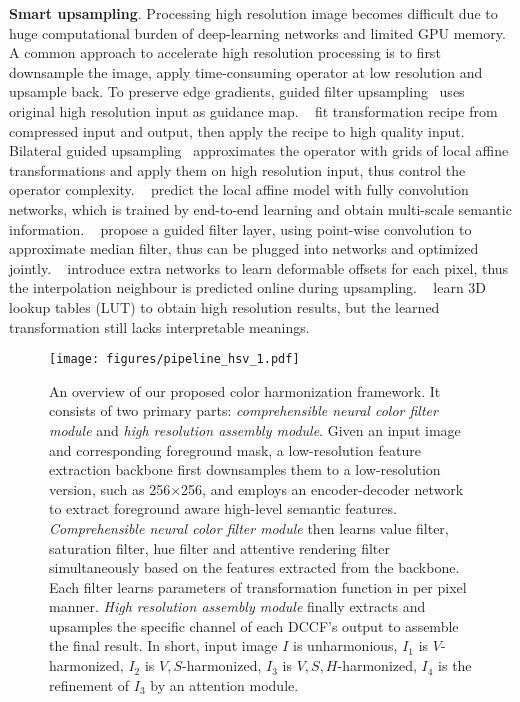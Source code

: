 \documentclass[runningheads]{llncs}
\begin{document}
    \noindent\textbf{Smart upsampling}. Processing high resolution image becomes difficult due to huge computational burden of deep-learning networks and limited GPU memory.
    A common approach to accelerate high resolution processing is to first downsample the image, apply time-consuming operator at low resolution and upsample back. To preserve edge gradients, guided filter upsampling~\cite{hekaiming2013GF} uses original high resolution input as guidance map. 
    ~\cite{gharbi2015transform} fit transformation recipe from compressed input and output, then apply the recipe to high quality input. Bilateral guided upsampling~\cite{chen2016bilateral} approximates the operator with grids of local affine transformations and apply them on high resolution input, thus control the operator complexity. 
    ~\cite{gharbi2017deep} predict the local affine model with fully convolution networks, which is trained by end-to-end learning and obtain multi-scale semantic information. 
    ~\cite{wu2018fast} propose a guided filter layer, using point-wise convolution to approximate median filter, thus can be plugged into networks and optimized jointly. 
    ~\cite{kim2019deformable} introduce extra networks to learn deformable offsets for each pixel, thus the interpolation neighbour is predicted online during upsampling. 
    ~\cite{CDTNet,zeng2020learning} learn 3D lookup tables (LUT) to obtain high resolution results, but the learned transformation still lacks interpretable meanings.


    


\begin{figure*}[h]
    \centering
    \texttt{[image: figures/pipeline\_hsv\_1.pdf]}
    \caption{
    An overview of our proposed color harmonization framework. It consists of two primary parts: \textit{comprehensible neural color filter module} and \textit{high resolution assembly module}.
    Given an input image and corresponding foreground mask, a low-resolution feature extraction backbone first downsamples them to a low-resolution version, such as 256$\times$256, and employs an encoder-decoder network to extract foreground aware high-level semantic features.
    \textit{Comprehensible neural color filter module} then learns value filter, saturation filter, hue filter and attentive rendering filter simultaneously based on the features extracted from the backbone.
    Each filter learns parameters of transformation function in per pixel manner.
\textit{High resolution assembly module} finally extracts and upsamples the specific channel of each DCCF's output to assemble the final result.
    In short, input image $I$ is unharmonious, $I_1$ is $V$-harmonized, $I_2$ is $V,S$-harmonized, $I_3$ is $V,S,H$-harmonized, $I_4$ is the refinement of $I_3$ by an attention module.
    }
\label{fig:pipeline}
    \end{figure*}
    
\end{document}
